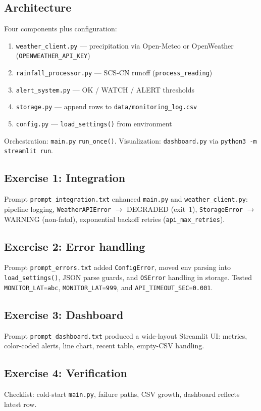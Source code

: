 \documentclass[11pt,a4paper]{article}
\begin{document}
\subsection{Architecture}
Four components plus configuration:
\begin{enumerate}[noitemsep]
  \item \texttt{weather\_client.py} --- precipitation via Open-Meteo or OpenWeather (\texttt{OPENWEATHER\_API\_KEY})
  \item \texttt{rainfall\_processor.py} --- SCS-CN runoff (\texttt{process\_reading})
  \item \texttt{alert\_system.py} --- OK / WATCH / ALERT thresholds
  \item \texttt{storage.py} --- append rows to \texttt{data/monitoring\_log.csv}
  \item \texttt{config.py} --- \texttt{load\_settings()} from environment
\end{enumerate}
Orchestration: \texttt{main.py} \texttt{run\_once()}. Visualization: \texttt{dashboard.py} via \texttt{python3 -m streamlit run}.

\subsection{Exercise 1: Integration}
Prompt \texttt{prompt\_integration.txt} enhanced \texttt{main.py} and \texttt{weather\_client.py}: pipeline logging, \texttt{WeatherAPIError} $\rightarrow$ DEGRADED (exit~1), \texttt{StorageError} $\rightarrow$ WARNING (non-fatal), exponential backoff retries (\texttt{api\_max\_retries}).

\subsection{Exercise 2: Error handling}
Prompt \texttt{prompt\_errors.txt} added \texttt{ConfigError}, moved env parsing into \texttt{load\_settings()}, JSON parse guards, and \texttt{OSError} handling in storage. Tested \texttt{MONITOR\_LAT=abc}, \texttt{MONITOR\_LAT=999}, and \texttt{API\_TIMEOUT\_SEC=0.001}.

\subsection{Exercise 3: Dashboard}
Prompt \texttt{prompt\_dashboard.txt} produced a wide-layout Streamlit UI: metrics, color-coded alerts, line chart, recent table, empty-CSV handling.

\subsection{Exercise 4: Verification}
Checklist: cold-start \texttt{main.py}, failure paths, CSV growth, dashboard reflects latest row.
\end{document}
